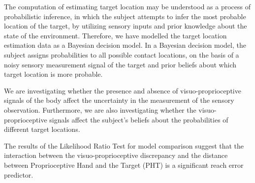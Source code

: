     
The computation of estimating target location may be understood as a process of probabilistic inference, in which the subject attempts to infer the most probable location of the target, by utilizing sensory inputs and prior knowledge about the state of the environment. Therefore, we have modelled the target location estimation data as a Bayesian decision model. In a Bayesian decision model, the subject assigns probabilities to all possible contact locations, on the basis of a noisy sensory measurement signal of the target and prior beliefs about which target location is more probable.
    
We are investigating whether the presence and absence of visuo-proprioceptive signals of the body affect the uncertainty in the measurement of the sensory observation. Furthermore, we are also investigating whether the visuo-proprioceptive signals affect the subject's beliefs about the probabilities of different target locations.




The results of the Likelihood Ratio Test for model comparison suggest that the interaction between the visuo-proprioceptive discrepancy and the distance between Proprioceptive Hand and the Target (PHT) is a significant reach error predictor.

